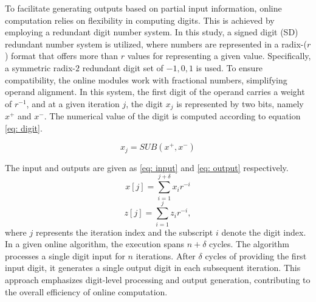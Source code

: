 \documentclass[conference]{IEEEtran}
\begin{document}
To facilitate generating outputs based on partial input information, online computation relies on flexibility in computing digits. This is achieved by employing a redundant digit number system. In this study, a signed digit (SD) redundant number system is utilized, where numbers are represented in a radix-($r$) format that offers more than $r$ values for representing a given value. Specifically, a symmetric radix-$2$ redundant digit set of ${-1, 0, 1}$ is used. To ensure compatibility, the online modules work with fractional numbers, simplifying operand alignment. In this system, the first digit of the operand carries a weight of $r^{-1}$, and at a given iteration $j$, the digit $x_j$ is represented by two bits, namely $x^+$ and $x^-$. The numerical value of the digit is computed according to equation \eqref{eq: digit}.

\begin{equation} \label{eq: digit}
    x_j = SUB(x^+,x^-)
\end{equation}

The input and outputs are given as \eqref{eq: input} and \eqref{eq: output} respectively.
\begin{equation} \label{eq: input}
    x[j]= \sum_{i=1}^{j+\delta}x_{i}r^{-i}
\end{equation}
\begin{equation} \label{eq: output}
    z[j]= \sum_{i=1}^{j}z_{i}r^{-i},
\end{equation}
where $j$ represents the iteration index and the subscript $i$ denote the digit index. %
In a given online algorithm, the execution spans $n+\delta$ cycles. The algorithm processes a single digit input for $n$ iterations. After $\delta$ cycles of providing the first input digit, it generates a single output digit in each subsequent iteration. This approach emphasizes digit-level processing and output generation, contributing to the overall efficiency of online computation.
\end{document}
